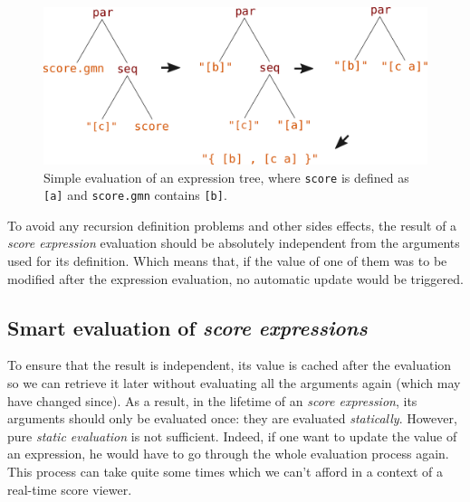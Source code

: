 \documentclass{article}
\newcommand{\OSC}[1]{\texttt{#1}}
\newcommand{\sExpr}{\emph{score expressions}}
\begin{document}
\begin{figure}[th]
\centering
\includegraphics[width=1\columnwidth]{imgs/classicEval}
\caption{Simple evaluation of an expression tree,
where \OSC{score} is defined as \OSC{[a]}
and \OSC{score.gmn} contains \OSC{[b]}.
\label{fig:classicEval} }
\end{figure}
To avoid any recursion definition problems and other sides effects, the result of a \emph{score expression} evaluation should be absolutely independent from the arguments used for its definition. Which means that, if the value of one of them was to be modified after the expression evaluation, no automatic update would be triggered. 

\subsection{Smart evaluation of \sExpr}

To ensure that the result is independent, its value is cached after the evaluation so we can retrieve it later without evaluating all the arguments again (which may have changed since). As a result, in the lifetime of an \emph{score expression}, its arguments should only be evaluated once: they are evaluated \emph{statically}.
However, pure \emph{static evaluation} is not sufficient. Indeed, if one want to update the value of an expression, he would have to go through the whole evaluation process again. This process can take quite some times which we can't afford in a context of a real-time score viewer.
\end{document}
